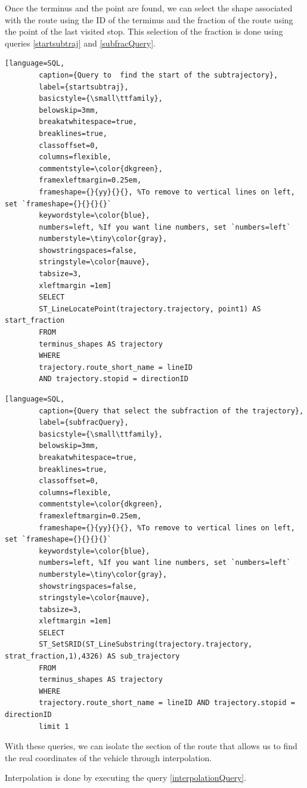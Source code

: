 \documentclass[12pt]{report}
\begin{document}
	
	Once the terminus and the point are found, we can select the shape associated with the route using the ID of the terminus and the fraction of the route using the point of the last visited stop. This selection of the fraction is done using queries \ref{startsubtraj} and \ref{subfracQuery}.
	
	
	\begin{lstlisting}[language=SQL,
		caption={Query to  find the start of the subtrajectory},
		label={startsubtraj},
		basicstyle={\small\ttfamily},
		belowskip=3mm,
		breakatwhitespace=true,
		breaklines=true,
		classoffset=0,
		columns=flexible,
		commentstyle=\color{dkgreen},
		framexleftmargin=0.25em,
		frameshape={}{yy}{}{}, %To remove to vertical lines on left, set `frameshape={}{}{}{}`
		keywordstyle=\color{blue},
		numbers=left, %If you want line numbers, set `numbers=left`
		numberstyle=\tiny\color{gray},
		showstringspaces=false,
		stringstyle=\color{mauve},
		tabsize=3,
		xleftmargin =1em]
		SELECT
		ST_LineLocatePoint(trajectory.trajectory, point1) AS start_fraction
		FROM
		terminus_shapes AS trajectory 
		WHERE
		trajectory.route_short_name = lineID 
		AND trajectory.stopid = directionID
	\end{lstlisting}
	
	
	\begin{lstlisting}[language=SQL,
		caption={Query that select the subfraction of the trajectory},
		label={subfracQuery},
		basicstyle={\small\ttfamily},
		belowskip=3mm,
		breakatwhitespace=true,
		breaklines=true,
		classoffset=0,
		columns=flexible,
		commentstyle=\color{dkgreen},
		framexleftmargin=0.25em,
		frameshape={}{yy}{}{}, %To remove to vertical lines on left, set `frameshape={}{}{}{}`
		keywordstyle=\color{blue},
		numbers=left, %If you want line numbers, set `numbers=left`
		numberstyle=\tiny\color{gray},
		showstringspaces=false,
		stringstyle=\color{mauve},
		tabsize=3,
		xleftmargin =1em]
		SELECT
		ST_SetSRID(ST_LineSubstring(trajectory.trajectory, strat_fraction,1),4326) AS sub_trajectory
		FROM
		terminus_shapes AS trajectory
		WHERE 
		trajectory.route_short_name = lineID AND trajectory.stopid = directionID
		limit 1
	\end{lstlisting}
	
	With these queries, we can isolate the section of the route that allows us to find the real coordinates of the vehicle through interpolation.
	
	Interpolation is done by executing the query \ref{interpolationQuery}.
	
\end{document}
